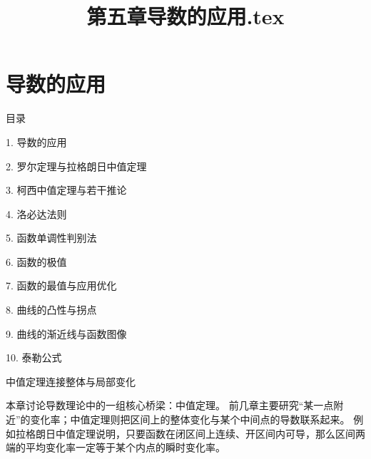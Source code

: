 \documentclass[aspectratio=169,10pt,fontset=fandol]{ctexbeamer}
\title{第五章导数的应用.tex}
\begin{document}
\section{导数的应用}
\begin{frame}[t,fragile]{目录}
\normalsize
{\color{blue}\normalsize 1. 导数的应用\par}\vspace{0.22em}
{\color{gray!40}\normalsize 2. 罗尔定理与拉格朗日中值定理\par}\vspace{0.22em}
{\color{gray!40}\normalsize 3. 柯西中值定理与若干推论\par}\vspace{0.22em}
{\color{gray!40}\normalsize 4. 洛必达法则\par}\vspace{0.22em}
{\color{gray!40}\normalsize 5. 函数单调性判别法\par}\vspace{0.22em}
{\color{gray!40}\normalsize 6. 函数的极值\par}\vspace{0.22em}
{\color{gray!40}\normalsize 7. 函数的最值与应用优化\par}\vspace{0.22em}
{\color{gray!40}\normalsize 8. 曲线的凸性与拐点\par}\vspace{0.22em}
{\color{gray!40}\normalsize 9. 曲线的渐近线与函数图像\par}\vspace{0.22em}
{\color{gray!40}\normalsize 10. 泰勒公式\par}\vspace{0.22em}
\end{frame}
\begin{frame}[t,fragile]{中值定理连接整体与局部变化}
\normalsize
{\normalsize
本章讨论导数理论中的一组核心桥梁：中值定理。 前几章主要研究“某一点附近”的变化率；中值定理则把区间上的整体变化与某个中间点的导数联系起来。 例如拉格朗日中值定理说明，只要函数在闭区间上连续、开区间内可导，那么区间两端的平均变化率一定等于某个内点的瞬时变化率。


}
\end{frame}
\end{document}
